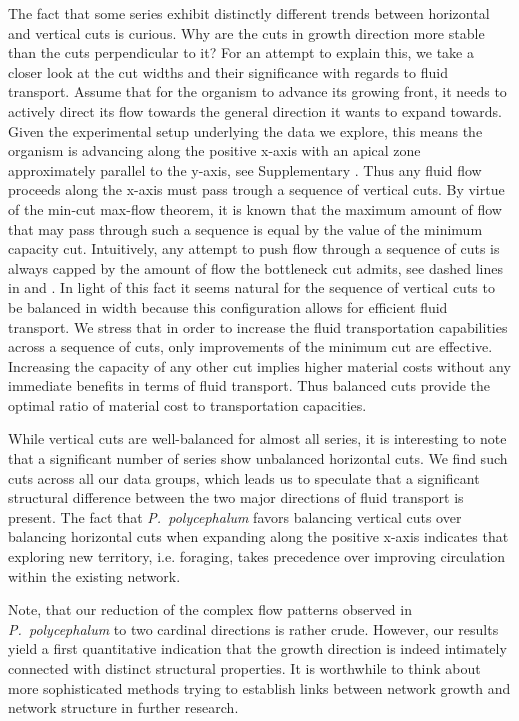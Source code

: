 		The fact that some series exhibit distinctly different trends between horizontal and vertical cuts is curious. Why are the cuts in growth direction more stable than the cuts perpendicular to it? For an attempt to explain this, we take a closer look at the cut widths and their significance with regards to fluid transport. Assume that for the organism to advance its growing front, it needs to actively direct its flow towards the general direction it wants to expand towards. Given the experimental setup underlying the data we explore, this means the organism is advancing along the positive x-axis with an apical zone approximately parallel to the y-axis, see Supplementary . Thus any fluid flow proceeds along the x-axis must pass trough a sequence of vertical cuts. By virtue of the min-cut max-flow theorem, it is known that the maximum amount of flow that may pass through such a sequence is equal by the value of the minimum capacity cut. Intuitively, any attempt to push flow through a sequence of cuts is always capped by the amount of flow the bottleneck cut admits, see dashed lines in  and . In light of this fact it seems natural for the sequence of vertical cuts to be balanced in width because this configuration allows for efficient fluid transport. We stress that in order to increase the fluid transportation capabilities across a sequence of cuts, only improvements of the minimum cut are effective. Increasing the capacity of any other cut implies higher material costs without any immediate benefits in terms of fluid transport. Thus balanced cuts provide the optimal ratio of material cost to transportation capacities.

		While vertical cuts are well-balanced for almost all series, it is interesting to note that a significant number of series show unbalanced horizontal cuts. We find such cuts across all our data groups, which leads us to speculate that a significant structural difference between the two major directions of fluid transport is present. The fact that \emph{P.~polycephalum} favors balancing vertical cuts over balancing horizontal cuts when expanding along the positive x-axis indicates that exploring new territory, i.e. foraging, takes precedence over improving circulation within the existing network.

		Note, that our reduction of the complex flow patterns observed in \emph{P.~polycephalum} to two cardinal directions is rather crude. However, our results yield a first quantitative indication that the growth direction is indeed intimately connected with distinct structural properties. It is worthwhile to think about more sophisticated methods trying to establish links between network growth and network structure in further research.

